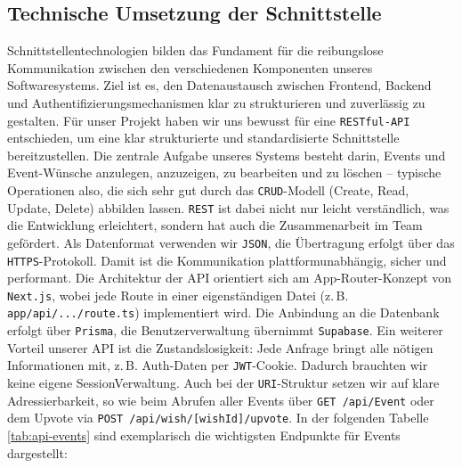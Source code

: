 \documentclass[a4paper,12pt]{article}
\begin{document}
\subsection{Technische Umsetzung der Schnittstelle}
Schnitt\-stellen\-technologien bilden das Fundament für die reibungslose Kommunikation zwischen den verschiedenen Komponenten unseres Software\-systems. Ziel ist es, den Daten\-austausch zwischen Frontend, Backend und Authentifizierungs\-mechanismen klar zu strukturieren und zuverlässig zu gestalten. Für unser Projekt haben wir uns bewusst für eine \texttt{RESTful-API} entschieden, um eine klar strukturierte und standardisierte Schnittstelle bereitzustellen. Die zentrale Aufgabe unseres Systems besteht darin, Events und Event-Wünsche anzulegen, anzuzeigen, zu bearbeiten und zu löschen – typische Operationen also, die sich sehr gut durch das \texttt{CRUD}-Modell (Create, Read, Update, Delete) abbilden lassen. \texttt{REST} ist dabei nicht nur leicht verständlich, was die Entwicklung erleichtert, sondern hat auch die Zusammenarbeit im Team gefördert. Als Datenformat verwenden wir \texttt{JSON}, die Übertragung erfolgt über das \texttt{HTTPS}-Protokoll. Damit ist die Kommunikation platt\-form\-unabhängig, sicher und performant. Die Architektur der API orientiert sich am App-Router-Konzept von \mbox{\texttt{Next.js}}, wobei jede Route in einer eigenständigen Datei (z.\,B. \mbox{\texttt{app/api/.../route.ts}}) implementiert wird. Die Anbindung an die Datenbank erfolgt über \texttt{Prisma}, die Benutzer\-verwaltung übernimmt \texttt{Supabase}. Ein weiterer Vorteil unserer API ist die Zustands\-losigkeit: Jede Anfrage bringt alle nötigen Informationen mit, z.\,B. Auth-Daten per \texttt{JWT}-Cookie. Dadurch brauchten wir keine eigene Session\-Verwaltung. Auch bei der \texttt{URI}-Struktur setzen wir auf klare Adressierbarkeit, so wie beim Abrufen aller Events über \mbox{\texttt{GET /api/Event}} oder dem Upvote via \mbox{\texttt{POST /api/wish/[wishId]/upvote}}. In der folgenden Tabelle \ref{tab:api-events} sind exemplarisch die wichtigsten Endpunkte für Events dargestellt:
\end{document}
